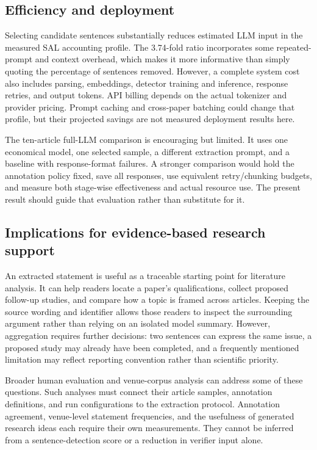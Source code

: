 \subsection{Efficiency and deployment}

Selecting candidate sentences substantially reduces estimated LLM input in the measured SAL
accounting profile. The 3.74-fold ratio incorporates some repeated-prompt and context overhead,
which makes it more informative than simply quoting the percentage of sentences removed.
However, a complete system cost also includes parsing, embeddings, detector training and inference,
response retries, and output tokens. API billing depends on the actual tokenizer and provider
pricing. Prompt caching and cross-paper batching could change that profile, but their projected
savings are not measured deployment results here.

The ten-article full-LLM comparison is encouraging but limited. It uses one economical model,
one selected sample, a different extraction prompt, and a baseline with response-format failures.
A stronger comparison would hold the annotation policy fixed, save all responses, use equivalent
retry/chunking budgets, and measure both stage-wise effectiveness and actual resource use.
The present result should guide that evaluation rather than substitute for it.

\subsection{Implications for evidence-based research support}

An extracted statement is useful as a traceable starting point for literature analysis. It can
help readers locate a paper's qualifications, collect proposed follow-up studies, and compare
how a topic is framed across articles. Keeping the source wording and identifier allows those
readers to inspect the surrounding argument rather than relying on an isolated model summary.
However, aggregation requires further decisions: two sentences can express the same issue,
a proposed study may already have been completed, and a frequently mentioned limitation may
reflect reporting convention rather than scientific priority.

Broader human evaluation and venue-corpus analysis can address some of these questions. Such
analyses must connect their article samples, annotation definitions, and run configurations to
the extraction protocol. Annotation agreement, venue-level statement frequencies, and the
usefulness of generated research ideas each require their own measurements. They cannot be
inferred from a sentence-detection score or a reduction in verifier input alone.

